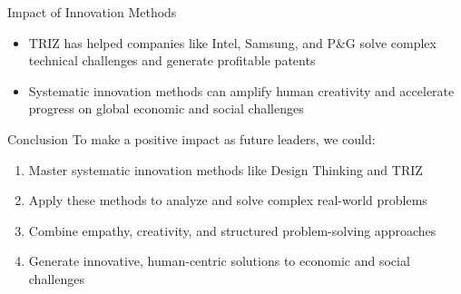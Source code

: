 \documentclass[final]{beamer}
\begin{document}
\begin{frame}{}
\begin{columns}[t]
\begin{column}{.3\linewidth}
\begin{block}{Impact of Innovation Methods}
\begin{itemize}
					\item TRIZ has helped companies like Intel, Samsung, and P\&G solve complex technical challenges and generate profitable patents
					\item Systematic innovation methods can amplify human creativity and accelerate progress on global economic and social challenges
				\end{itemize}
			\end{block}
			\vspace{1cm}
			\begin{block}{Conclusion}
				To make a positive impact as future leaders, we could:
				\begin{enumerate}
					\item Master systematic innovation methods like Design Thinking and TRIZ
					\item Apply these methods to analyze and solve complex real-world problems
					\item Combine empathy, creativity, and structured problem-solving approaches
					\item Generate innovative, human-centric solutions to economic and social challenges
				\end{enumerate}
			\end{block}

		\end{column}
	\end{columns}

\end{frame}
\end{document}
